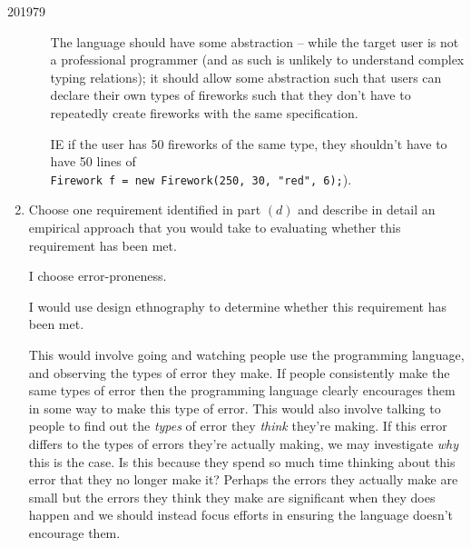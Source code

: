 \documentclass[10pt,\jkfside,a4paper]{article}
\begin{document}
\begin{examquestion}{2019}{7}{9}
\begin{enumerate}
\begin{itemize}
The language should have some abstraction -- while the target user is not a
professional programmer (and as such is unlikely to understand complex
typing relations); it should allow some abstraction such that users can
declare their own types of fireworks such that they don't have to
repeatedly create fireworks with the same specification.

IE if the user has 50 fireworks of the same type, they shouldn't have to
have 50 lines of \\
\texttt{Firework f = new Firework(250, 30, "red", 6);}).

\end{itemize}

\item Choose one requirement identified in part $(d)$ and describe in detail
an empirical approach that you would take to evaluating whether this
requirement has been met.

I choose error-proneness.

I would use design ethnography to determine whether this requirement has
been met.

This would involve going and watching people use the programming language,
and observing the types of error they make. If people consistently make the
same types of error then the programming language clearly encourages them
in some way to make this type of error. This would also involve talking to
people to find out the \textit{types} of error they \textit{think} they're
making. If this error differs to the types of errors they're actually
making, we may investigate \textit{why} this is the case. Is this because
they spend so much time thinking about this error that they no longer make
it? Perhaps the errors they actually make are small but the errors they
think they make are significant when they does happen and we should
instead focus efforts in ensuring the language doesn't encourage them.

\end{enumerate}

\end{examquestion}
\end{document}
